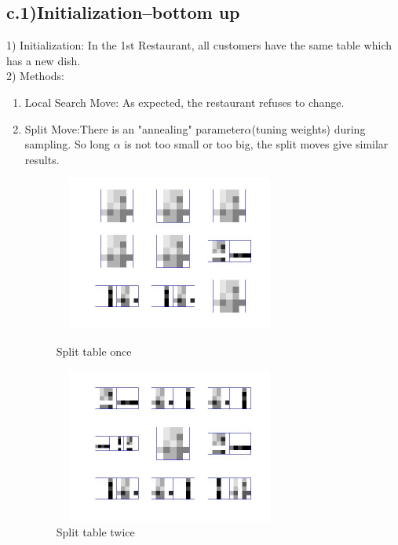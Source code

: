 \documentclass{article}
\begin{document}
\begin{spacing}{1.1}
\subsection{c.1)Initialization--bottom up}
1) Initialization: In the 1st Restaurant, all customers have the same table which has a new dish.\\
2) Methods:\\
\begin{enumerate}
\item Local Search Move: As expected, the restaurant refuses to change.\\
\item Split Move:There is an "annealing" parameter$\alpha$(tuning weights) during sampling. So long $\alpha$ is not
too small or too big, the split moves give similar results. \\
\begin{figure}[h] 
  \begin{minipage}[b]{0.5\textwidth} 
    \centering 
    \includegraphics[width=3in,height=2in]{td_s_1.jpg} 
    \caption{Split table once}
    \label{fig:by:table} 
  \end{minipage}%
  \begin{minipage}[b]{0.5\textwidth} 
    \centering 
    \includegraphics[width=3in,height=2in]{td_s_2.jpg} 
    \caption{Split table twice}
    \label{fig:by:table}  
   \end{minipage}%
\end{figure}


\end{enumerate}
\end{spacing}
\end{document}
